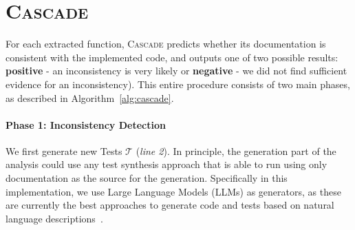 \documentclass[acmsmall, screen]{acmart}
\newcommand{\tool}{\textsc{Cascade}\xspace}
\begin{document}
\section{\tool}\label{sec:cascade}
For each extracted function, \tool predicts whether its documentation is consistent with the implemented code, and outputs one of two possible results:
\textbf{positive} - an inconsistency is very likely or \textbf{negative} - we did not find sufficient evidence for an inconsistency). This entire procedure consists of two main phases, as described in Algorithm~\ref{alg:cascade}.

\paragraph{\textbf{Phase 1: Inconsistency Detection}}

We first generate new Tests $\mathcal{T}$ (\textit{line 2}). 
In principle, the generation part of the analysis could use any test synthesis approach that is able to run using only documentation as the source for the generation. Specifically in this implementation, we use Large Language Models (LLMs) as generators, as these are currently the best approaches to generate code and tests based on natural language descriptions~\cite{schafer2023empirical, ni2023lever, wang2021codet5}. 


\end{document}
